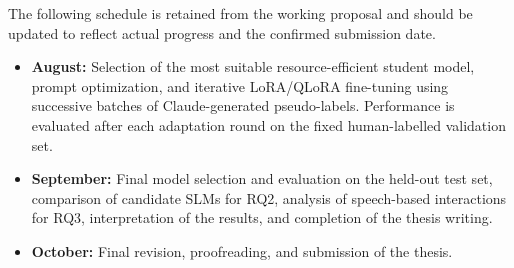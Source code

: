 \documentclass[11pt,a4paper]{article}
\begin{document}
The following schedule is retained from the working proposal and should be
updated to reflect actual progress and the confirmed submission date.

\begin{itemize}[nosep]


\item \textbf{August:} Selection of the most suitable resource-efficient student model, prompt optimization, and iterative LoRA/QLoRA fine-tuning using successive batches of Claude-generated pseudo-labels. Performance is evaluated after each adaptation round on the fixed human-labelled validation set.

\item \textbf{September:} Final model selection and evaluation on the held-out test set, comparison of candidate SLMs for RQ2, analysis of speech-based interactions for RQ3, interpretation of the results, and completion of the thesis writing.

\item \textbf{October:} Final revision, proofreading, and submission of the thesis.

\end{itemize}
\end{document}
